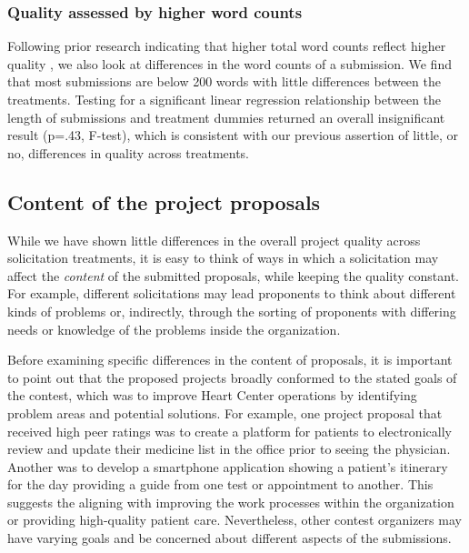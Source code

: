 \documentclass[11pt, titlepage]{article}
\begin{document}
\subsubsection{Quality assessed by higher word
counts}\label{quality-assessed-by-higher-word-counts}

Following prior research indicating that higher total word counts
reflect higher quality \citep{blumenstock2008size}, we also look at
differences in the word counts of a submission. We find that most
submissions are below 200 words with little differences between the
treatments. Testing for a significant linear regression relationship
between the length of submissions and treatment dummies returned an
overall insignificant result (p=.43, F-test), which is consistent with
our previous assertion of little, or no, differences in quality across
treatments.

\subsection{Content of the project
proposals}\label{content-of-the-project-proposals}

While we have shown little differences in the overall project quality
across solicitation treatments, it is easy to think of ways in which a
solicitation may affect the \emph{content} of the submitted proposals,
while keeping the quality constant. For example, different solicitations
may lead proponents to think about different kinds of problems or,
indirectly, through the sorting of proponents with differing needs or
knowledge of the problems inside the organization.

Before examining specific differences in the content of proposals, it is
important to point out that the proposed projects broadly conformed to
the stated goals of the contest, which was to improve Heart Center
operations by identifying problem areas and potential solutions. For
example, one project proposal that received high peer ratings was to
create a platform for patients to electronically review and update their
medicine list in the office prior to seeing the physician. Another was
to develop a smartphone application showing a patient's itinerary for
the day providing a guide from one test or appointment to another. This
suggests the aligning with improving the work processes within the
organization or providing high-quality patient care. Nevertheless, other
contest organizers may have varying goals and be concerned about
different aspects of the submissions.
\end{document}
